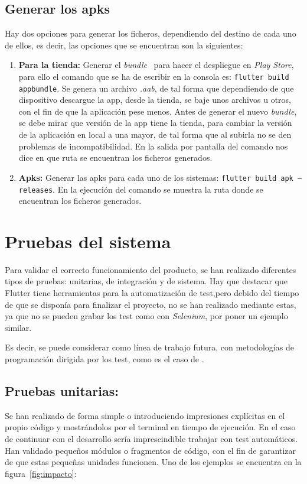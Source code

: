 \subsection{Generar los apks}
Hay dos opciones para generar los ficheros, dependiendo del destino de cada uno de ellos, es decir, las opciones que se encuentran son la siguientes:
\begin{enumerate}
	\item \textbf{Para la tienda:} Generar el \emph{bundle}~\cite{wiki:bundle} para hacer el despliegue en \emph{Play Store}, para ello el comando que se ha de escribir en la consola es: \texttt{flutter build appbundle}. Se genera un archivo \emph{.aab}, de tal forma que dependiendo de que dispositivo descargue la app, desde la tienda, se baje unos archivos u otros, con el fin de que la aplicación pese menos.  Antes de generar el nuevo \emph{bundle}, se debe mirar que versión de la app tiene la tienda, para cambiar la versión de la aplicación en local a una mayor, de tal forma que al subirla no se den problemas de incompatibilidad. En la salida por pantalla del comando nos dice en que ruta se encuentran los ficheros generados.
	\item \textbf{Apks:} Generar las apks para cada uno de los sistemas: \texttt{flutter build apk --releases}. En la ejecución del comando se muestra la ruta donde se encuentran los ficheros generados.
\end{enumerate} 

\section{Pruebas del sistema}
Para validar el correcto funcionamiento del producto, se han realizado diferentes tipos de pruebas: unitarias, de integración y de sistema. Hay que destacar que Flutter tiene herramientas para la automatización de test,pero debido del tiempo de que se disponía para finalizar el proyecto, no se han realizado mediante estas, ya que no se pueden grabar los test como con \emph{Selenium}, por poner un ejemplo similar. 

Es decir, se puede considerar como línea de trabajo futura, con metodologías de programación dirigida por los test, como es el caso de .

\subsection{Pruebas unitarias:}
Se han realizado de forma simple o introduciendo impresiones explícitas en el propio código y mostrándolos por el terminal en tiempo de ejecución. En el caso de continuar con el desarrollo sería imprescindible trabajar con test automáticos. Han validado pequeños módulos o fragmentos de código, con el fin de garantizar de que estas pequeñas unidades funcionen. Uno de los ejemplos se encuentra en la figura~\ref{fig:impacto}:

